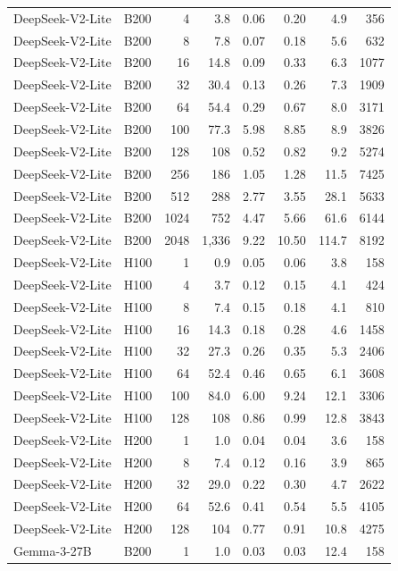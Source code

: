 \begin{longtable}{llrrrrrr}
DeepSeek-V2-Lite & B200 & 4 & 3.8 & 0.06 & 0.20 & 4.9 & 356 \\
DeepSeek-V2-Lite & B200 & 8 & 7.8 & 0.07 & 0.18 & 5.6 & 632 \\
DeepSeek-V2-Lite & B200 & 16 & 14.8 & 0.09 & 0.33 & 6.3 & 1077 \\
DeepSeek-V2-Lite & B200 & 32 & 30.4 & 0.13 & 0.26 & 7.3 & 1909 \\
DeepSeek-V2-Lite & B200 & 64 & 54.4 & 0.29 & 0.67 & 8.0 & 3171 \\
DeepSeek-V2-Lite & B200 & 100 & 77.3 & 5.98 & 8.85 & 8.9 & 3826 \\
DeepSeek-V2-Lite & B200 & 128 & 108 & 0.52 & 0.82 & 9.2 & 5274 \\
DeepSeek-V2-Lite & B200 & 256 & 186 & 1.05 & 1.28 & 11.5 & 7425 \\
DeepSeek-V2-Lite & B200 & 512 & 288 & 2.77 & 3.55 & 28.1 & 5633 \\
DeepSeek-V2-Lite & B200 & 1024 & 752 & 4.47 & 5.66 & 61.6 & 6144 \\
DeepSeek-V2-Lite & B200 & 2048 & 1,336 & 9.22 & 10.50 & 114.7 & 8192 \\
DeepSeek-V2-Lite & H100 & 1 & 0.9 & 0.05 & 0.06 & 3.8 & 158 \\
DeepSeek-V2-Lite & H100 & 4 & 3.7 & 0.12 & 0.15 & 4.1 & 424 \\
DeepSeek-V2-Lite & H100 & 8 & 7.4 & 0.15 & 0.18 & 4.1 & 810 \\
DeepSeek-V2-Lite & H100 & 16 & 14.3 & 0.18 & 0.28 & 4.6 & 1458 \\
DeepSeek-V2-Lite & H100 & 32 & 27.3 & 0.26 & 0.35 & 5.3 & 2406 \\
DeepSeek-V2-Lite & H100 & 64 & 52.4 & 0.46 & 0.65 & 6.1 & 3608 \\
DeepSeek-V2-Lite & H100 & 100 & 84.0 & 6.00 & 9.24 & 12.1 & 3306 \\
DeepSeek-V2-Lite & H100 & 128 & 108 & 0.86 & 0.99 & 12.8 & 3843 \\
DeepSeek-V2-Lite & H200 & 1 & 1.0 & 0.04 & 0.04 & 3.6 & 158 \\
DeepSeek-V2-Lite & H200 & 8 & 7.4 & 0.12 & 0.16 & 3.9 & 865 \\
DeepSeek-V2-Lite & H200 & 32 & 29.0 & 0.22 & 0.30 & 4.7 & 2622 \\
DeepSeek-V2-Lite & H200 & 64 & 52.6 & 0.41 & 0.54 & 5.5 & 4105 \\
DeepSeek-V2-Lite & H200 & 128 & 104 & 0.77 & 0.91 & 10.8 & 4275 \\
Gemma-3-27B & B200 & 1 & 1.0 & 0.03 & 0.03 & 12.4 & 158 \\

\end{longtable}
